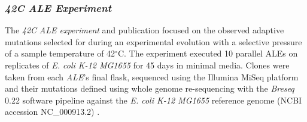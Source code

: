 \documentclass[12pt,final,masters,chapterheads]{ucsd}  %
\begin{document}
\subsubsection{\textit{42C} \textit{ALE Experiment}}
The \textit{42C} \textit{ALE experiment} and publication focused on the observed adaptive mutations selected for during an experimental evolution with a selective pressure of a sample temperature of 42$^{\circ}$C. The experiment executed 10 parallel ALEs on replicates of \textit{E. coli K-12 MG1655} for 45 days in minimal media. Clones were taken from each \textit{ALE}'s final flask, sequenced using the Illumina MiSeq platform and their mutations defined using whole genome re-sequencing with the \textit{Breseq} 0.22 software pipeline against the \textit{E. coli K-12 MG1655} reference genome (NCBI accession NC\_000913.2) \cite{pmid25015645}.
\end{document}
